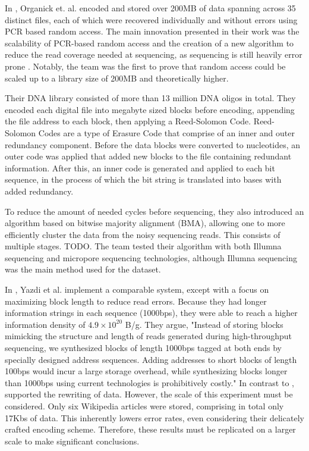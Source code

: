 \documentclass[a4paper,conference]{IEEEtran}
\begin{document}
In \cite{}, Organick et. al. encoded and stored over 200MB of data spanning across 35 distinct files, each of which were recovered individually and without errors using PCR based random access. The main innovation presented in their work was the scalability of PCR-based random access and the creation of a new algorithm to reduce the read coverage needed at sequencing, as sequencing is still heavily error prone \cite{}. Notably, the team was the first to prove that random access could be scaled up to a library size of 200MB and theoretically higher.

Their DNA library consisted of more than 13 million DNA oligos in total. They encoded each digital file into megabyte sized blocks before encoding, appending the file address to each block, then applying a Reed-Solomon Code. Reed-Solomon Codes are a type of Erasure Code that comprise of an inner and outer redundancy component. Before the data blocks were converted to nucleotides, an outer code was applied that added new blocks to the file containing redundant information. After this, an inner code is generated and applied to each bit sequence, in the process of which the bit string is translated into bases with added redundancy. 

To reduce the amount of needed cycles before sequencing, they also introduced an algorithm based on bitwise majority alignment (BMA), allowing one to more efficiently cluster the data from the noisy sequencing reads. This consists of multiple stages. TODO. The team tested their algorithm with both Illumna sequencing and micropore sequencing technologies, although Illumna sequencing was the main method used for the dataset.

In \cite{}, Yazdi et al. implement a comparable system, except with a focus on maximizing block length to reduce read errors. Because they had longer information strings in each sequence (1000bps), they were able to reach a higher information density of $4.9 \times 10^{20}$ B/g. They argue, "Instead of storing blocks mimicking the structure and length of reads generated during high-throughput sequencing, we synthesized blocks of length 1000bps tagged at both ends by specially designed address sequences. Adding addresses to short blocks of length 100bps would incur a large storage overhead, while synthesizing blocks longer than 1000bps using current technologies is prohibitively costly." In contrast to \cite{}, \cite{} supported the rewriting of data. However, the scale of this experiment must be considered. Only six Wikipedia articles were stored, comprising in total only 17Kbs of data. This inherently lowers error rates, even considering their delicately crafted encoding scheme. Therefore, these results must be replicated on a larger scale to make significant conclusions. 
\end{document}
